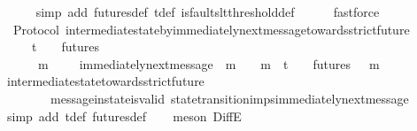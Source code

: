 \begin{isabellebody}
\ \ \ \ \isamarkupfalse%
\ {\isacharparenleft}simp\ add{\isacharcolon}\ futures{\isacharunderscore}def\ {\isasymSigma}t{\isacharunderscore}def\ is{\isacharunderscore}faults{\isacharunderscore}lt{\isacharunderscore}threshold{\isacharunderscore}def{\isacharparenright}\isanewline
\ \ \ \ \isamarkupfalse%
\ fastforce\ \ \ \isanewline
{}\isamarkupfalse%
%
\endisatagproof
{\isafoldproof}%
%
\isadelimproof
\isanewline
%
\endisadelimproof
\isanewline
{}\isamarkupfalse%
\ {\isacharparenleft}\ Protocol{\isacharparenright}\ intermediate{\isacharunderscore}state{\isacharunderscore}by{\isacharunderscore}immediately{\isacharunderscore}next{\isacharunderscore}message{\isacharunderscore}towards{\isacharunderscore}strict{\isacharunderscore}future{\isacharcolon}\ \isanewline
\ \ {\isachardoublequoteopen}{\isasymforall}\ {\isasymsigma}\ {\isasymin}\ {\isasymSigma}t{\isachardot}\ {\isasymforall}\ {\isasymsigma}{\isacharprime}\ {\isasymin}\ futures\ {\isasymsigma}{\isachardot}\ {\isasymsigma}\ {\isasymsubset}\ {\isasymsigma}{\isacharprime}\ \isanewline
\ \ \ \ {\isasymlongrightarrow}\ {\isacharparenleft}{\isasymexists}\ m\ {\isasymin}\ {\isasymsigma}{\isacharprime}\ {\isacharminus}\ {\isasymsigma}{\isachardot}\ immediately{\isacharunderscore}next{\isacharunderscore}message\ {\isacharparenleft}{\isasymsigma}{\isacharcomma}\ m{\isacharparenright}\ {\isasymand}\ {\isasymsigma}\ {\isasymunion}\ {\isacharbraceleft}m{\isacharbraceright}\ {\isasymin}\ {\isasymSigma}t\ {\isasymand}\ {\isasymsigma}{\isacharprime}\ {\isasymin}\ futures\ {\isacharparenleft}{\isasymsigma}\ {\isasymunion}\ {\isacharbraceleft}m{\isacharbraceright}{\isacharparenright}{\isacharparenright}{\isachardoublequoteclose}\isanewline
%
\isadelimproof
\ \ %
\endisadelimproof
%
\isatagproof
{}\isamarkupfalse%
\ intermediate{\isacharunderscore}state{\isacharunderscore}towards{\isacharunderscore}strict{\isacharunderscore}future\isanewline
\ \ \ \ \ \ \ \ message{\isacharunderscore}in{\isacharunderscore}state{\isacharunderscore}is{\isacharunderscore}valid\ state{\isacharunderscore}transition{\isacharunderscore}imps{\isacharunderscore}immediately{\isacharunderscore}next{\isacharunderscore}message\isanewline
\ \ \isamarkupfalse%
\ {\isacharparenleft}simp\ add{\isacharcolon}\ {\isasymSigma}t{\isacharunderscore}def\ futures{\isacharunderscore}def{\isacharparenright}\isanewline
\ \ \isamarkupfalse%
\ {\isacharparenleft}meson\ DiffE{\isacharparenright}%
\endisatagproof
{\isafoldproof}%
%
\isadelimproof

\end{isabellebody}
